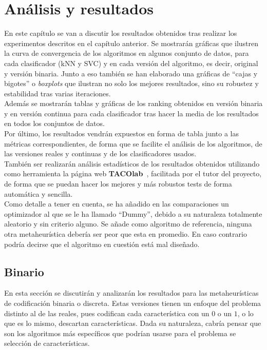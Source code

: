 \chapter{Análisis y resultados}
En este capítulo se van a discutir los resultados obtenidos tras realizar los experimentos descritos en el capítulo anterior. Se mostrarán gráficas que ilustren la curva de convergencia de los algoritmos en algunos conjunto de datos, para cada clasificador (kNN y SVC) y en cada versión del algoritmo, es decir, original y versión binaria. Junto a eso también se han elaborado una gráficas de ``cajas y bigotes'' o \textit{boxplots} que ilustran no solo los mejores resultados, sino su robustez y estabilidad tras varias iteraciones. \\[6pt]
Además se mostrarán tablas y gráficas de los ranking obtenidos en versión binaria y en versión continua para cada clasificador tras hacer la media de los resultados en todos los conjuntos de datos.\\[6pt]
Por último, los resultados vendrán expuestos en forma de tabla junto a las métricas correspondientes, de forma que se facilite el análisis de los algoritmos, de las versiones reales y continuas y de los clasificadores usados.\\[6pt]
También ser realizarán análisis estadísticos de los resultados obtenidos utilizando como herramienta la página web \textbf{TACOlab}~\cite{taco_website}, facilitada por el tutor del proyecto, de forma que se puedan hacer los mejores y más robustos tests de forma automática y sencilla.\\[6pt]
Como detalle a tener en cuenta, se ha añadido en las comparaciones un optimizador al que se le ha llamado ``Dummy'', debido a su naturaleza totalmente aleatorio y sin criterio alguno. Se añade como algoritmo de referencia, ninguna otra metaheurística debería ser peor que esta en promedio. En caso contrario podría decirse que el algoritmo en cuestión está mal diseñado.

\section{Binario}
En esta sección se discutirán y analizarán los resultados para las metaheurísticas de codificación binaria o discreta. Estas versiones tienen un enfoque del problema distinto al de las reales, pues codifican cada característica con un $0$ o un $1$, o lo que es lo mismo, descartan características. Dada su naturaleza, cabría pensar que son los algoritmos más específicos que podrían usarse para el problema se selección de características.

